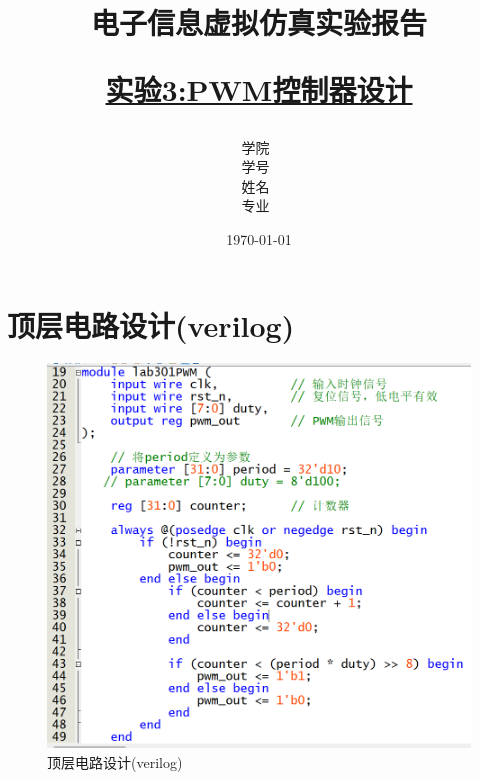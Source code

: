 \documentclass[12pt,hyperref,a4paper,UTF8]{ctexart}
\title{ 
        \vspace{1cm}
        \heiti \Huge \textbf{电子信息虚拟仿真实验报告} \par
        \vspace{1cm} 
        \heiti \Large {\underline{实验3:PWM控制器设计}   } 
        \vspace{3cm}
    
    }
\author{
        \vspace{0.5cm}
        \kaishu\Large 学院\ \dlmu[9cm]{卓越学院} \\ %
        \vspace{0.5cm}
        \kaishu\Large 学号\ \dlmu[9cm]{23040447} \\ %
        \vspace{0.5cm}
        \kaishu\Large 姓名\ \dlmu[9cm]{陈文轩} \qquad  \\ %
        \vspace{0.5cm}
        \kaishu\Large 专业\ \dlmu[9cm]{智能硬件与系统(电子信息工程)} \qquad \\ %
    }
\date{\today} %
\begin{document}
\cover
\thispagestyle{empty} %






\newpage
\tableofcontents
\thispagestyle{empty} %

\newpage
\setcounter{page}{1} %


\section{顶层电路设计(verilog)}


\begin{figure}[H]
    \centering
    \begin{minipage}{1\textwidth}
        \centering
        \includegraphics[width=1\textwidth]{figures/301.png}
        \caption{顶层电路设计(verilog)}
        \label{fig:system_block_diagram}
    \end{minipage}
\end{figure}
\end{document}
